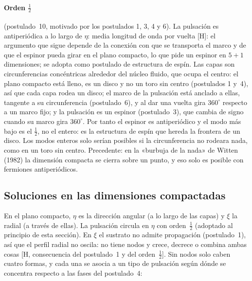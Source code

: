 \documentclass[11pt,a4paper]{article}
\newcommand{\st}[1]{\textup{[#1]}}
\newcommand{\apartado}[1]{\paragraph{#1}}
\begin{document}
\apartado{Orden $\tfrac12$} (postulado~10, motivado por los postulados 1, 3, 4 y 6). La pulsación es antiperiódica a lo largo de $\eta$: media longitud de onda por vuelta \st{H}: el argumento que sigue depende de la conexión con que se transporta el marco y de que el espinor pueda girar en el plano compacto, lo que pide un espinor en $5+1$ dimensiones; se adopta como postulado de estructura de espín. Las capas son circunferencias concéntricas alrededor del núcleo fluido, que ocupa el centro: el plano compacto está lleno, es un disco y no un toro sin centro (postulados 1 y~4), así que cada capa rodea un disco; el marco de la pulsación está anclado a ellas, tangente a su circunferencia (postulado~6), y al dar una vuelta gira $360^\circ$ respecto a un marco fijo; y la pulsación es un espinor (postulado~3), que cambia de signo cuando su marco gira $360^\circ$. Por tanto el espinor es antiperiódico y el modo más bajo es el $\tfrac12$, no el entero: es la estructura de espín que hereda la frontera de un disco. Los modos enteros solo serían posibles si la circunferencia no rodeara nada, como en un toro sin centro. Precedente: en la «burbuja de la nada» de Witten (1982) la dimensión compacta se cierra sobre un punto, y eso solo es posible con fermiones antiperiódicos.

\setcounter{subsection}{-1}
\subsection{Soluciones en las dimensiones compactadas}\label{sec:compactadas}

En el plano compacto, $\eta$ es la dirección angular (a lo largo de las capas) y $\xi$ la radial (a través de ellas). La pulsación circula en $\eta$ con orden~$\tfrac12$ (adoptado al principio de esta sección). En $\xi$ el sustrato no admite propagación (postulado~1), así que el perfil radial no oscila: no tiene nodos y crece, decrece o combina ambas cosas \st{H, consecuencia del postulado~1 y del orden~$\tfrac12$}. Sin nodos solo caben cuatro formas, y cada una se asocia a un tipo de pulsación según dónde se concentra respecto a las fases del postulado~4:
\end{document}

